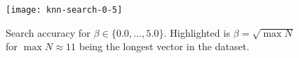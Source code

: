 \begin{figure}[h]
	\centering
	\texttt{[image: knn-search-0-5]}  %
	\caption[Search accuracy for $\beta \in \{ 0.0, \ldots, 5.0 \}$]{
		Search accuracy for $\beta \in \{ 0.0, \ldots, 5.0 \}$.
		{\color{magenta}Highlighted} is $\beta = \sqrt{\max N}$ for $\max N \approx 11$ being the longest vector in the dataset.
	}\label{figure:knn-search-fine}
\end{figure}
